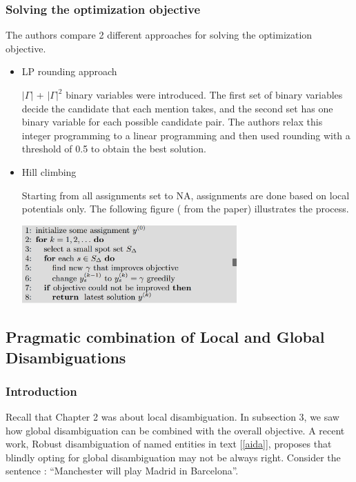  
  \subsubsection{Solving the optimization objective}
  The authors compare 2 different approaches for solving the optimization objective.
  \begin{itemize}
   \item LP rounding approach\bigskip
   
    $|\Gamma|$ + $|\Gamma|^2$ binary variables were introduced. The first set of binary variables decide the candidate that
   each mention takes, and the second set has one binary variable for each possible candidate pair. 
   The authors relax this integer programming to a linear programming and then used rounding with a threshold of 0.5 to
   obtain the best solution.
   
   \item Hill climbing
   
   Starting from all assignments set to NA, assignments are done based on local potentials only. The following figure (
   from the paper) illustrates the process.
   \begin{center}
    \includegraphics[height = 3cm]{hill}
   \end{center}

  \end{itemize}


\subsection{Pragmatic combination of Local and Global Disambiguations}

\subsubsection{Introduction}

Recall that Chapter 2 was about local disambiguation. In subsection 3, we saw how
global disambiguation can be combined with the overall objective. A recent work, 
Robust disambiguation of named entities in text [\ref{aida}], proposes that 
blindly opting for global disambiguation may not be always right. 
Consider the sentence : ``Manchester will play Madrid in Barcelona''.

